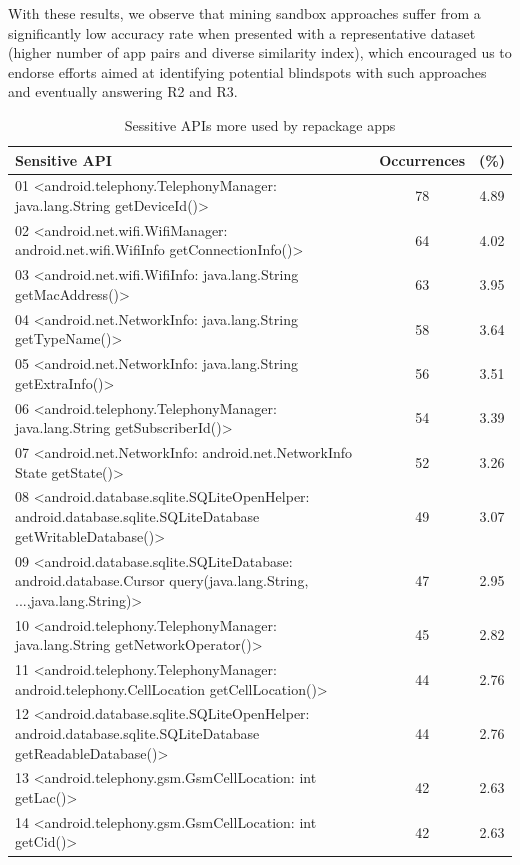 With these results, we observe that mining sandbox approaches suffer from a significantly low accuracy rate when presented with a representative dataset (higher number of app pairs and diverse similarity index), which encouraged us to endorse efforts aimed at identifying potential blindspots with such approaches and eventually answering R2 and R3.

\begin{table}[t]
  \caption{Sessitive APIs more used by repackage apps}
  \centering
  \begin{small}
 \begin{tabular}{lcc}
   \toprule
   Sensitive API & Occurrences & (\%) \\
   \midrule
   01 <android.telephony.TelephonyManager: java.lang.String getDeviceId()> &  78 & 4.89 \\
   02 <android.net.wifi.WifiManager: android.net.wifi.WifiInfo getConnectionInfo()> &  64 & 4.02 \\
   03 <android.net.wifi.WifiInfo: java.lang.String getMacAddress()> &  63 & 3.95 \\
   04 <android.net.NetworkInfo: java.lang.String getTypeName()> &  58 & 3.64 \\
   05 <android.net.NetworkInfo: java.lang.String getExtraInfo()> &  56 & 3.51 \\
   06 <android.telephony.TelephonyManager: java.lang.String getSubscriberId()> &  54 & 3.39 \\
   07 <android.net.NetworkInfo: android.net.NetworkInfo State getState()> &  52 & 3.26 \\
   08 <android.database.sqlite.SQLiteOpenHelper: android.database.sqlite.SQLiteDatabase getWritableDatabase()> &  49 & 3.07 \\
   09 <android.database.sqlite.SQLiteDatabase: android.database.Cursor query(java.lang.String, ...,java.lang.String)> &  47 & 2.95 \\
   10 <android.telephony.TelephonyManager: java.lang.String getNetworkOperator()> &  45 & 2.82 \\
   11 <android.telephony.TelephonyManager: android.telephony.CellLocation getCellLocation()> &  44 & 2.76 \\
   12 <android.database.sqlite.SQLiteOpenHelper: android.database.sqlite.SQLiteDatabase getReadableDatabase()> &  44 & 2.76 \\
   13 <android.telephony.gsm.GsmCellLocation: int getLac()> &  42 & 2.63 \\
   14 <android.telephony.gsm.GsmCellLocation: int getCid()> &  42 & 2.63 \\
   

\end{tabular}
\end{small}
\end{table}
